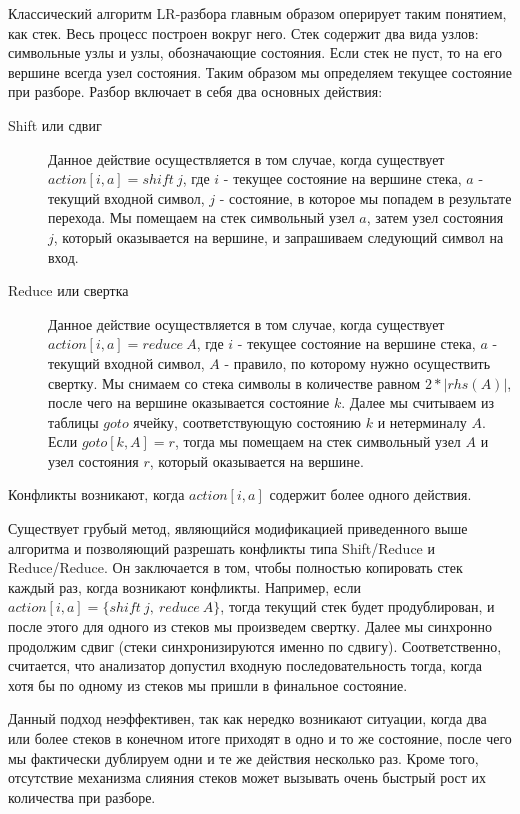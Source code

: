 Классический алгоритм LR-разбора главным образом оперирует таким понятием, как стек. Весь процесс построен вокруг него. Стек содержит два вида узлов: символьные узлы и узлы, обозначающие состояния. Если стек не пуст, то на его вершине всегда узел состояния. Таким образом мы определяем текущее состояние при разборе. Разбор включает в себя два основных действия:
\begin{description}
  \item[Shift или сдвиг] Данное действие осуществляется в том случае, когда существует $action[i, a] = shift\ j$, где $i$ - текущее состояние на вершине стека, $a$ - текущий входной символ, $j$ - состояние, в которое мы попадем в результате перехода. Мы помещаем на стек символьный узел $a$, затем узел состояния $j$, который оказывается на вершине, и запрашиваем следующий символ на вход.
  \item[Reduce или свертка] Данное действие осуществляется в том случае, когда существует $action[i, a] = reduce\ A$, где $i$ - текущее состояние на вершине стека, $a$ - текущий входной символ, $A$ - правило, по которому нужно осуществить свертку. Мы снимаем со стека символы в количестве равном $2 * |rhs(A)|$, после чего на вершине оказывается состояние $k$. Далее мы считываем из таблицы $goto$ ячейку, соответствующую состоянию $k$ и нетерминалу $A$. Если $goto[k, A] = r$, тогда мы помещаем на стек символьный узел $A$ и узел состояния $r$, который оказывается на вершине.
\end{description}
Конфликты возникают, когда $action[i, a]$ содержит более одного действия.

Существует грубый метод, являющийся модификацией приведенного выше алгоритма и позволяющий разрешать конфликты типа Shift/Reduce и Reduce/Reduce. Он заключается в том, чтобы полностью копировать стек каждый раз, когда возникают конфликты. Например, если $action[i, a] = \{shift\ j,\ reduce\ A\}$, тогда текущий стек будет продублирован, и после этого для одного из стеков мы произведем свертку. Далее мы синхронно продолжим сдвиг (стеки синхронизируются именно по сдвигу). Соответственно, считается, что анализатор допустил входную последовательность тогда, когда хотя бы по одному из стеков мы пришли в финальное состояние.

Данный подход неэффективен, так как нередко возникают ситуации, когда два или более стеков в конечном итоге приходят в одно и то же состояние, после чего мы фактически дублируем одни и те же действия несколько раз. Кроме того, отсутствие механизма слияния стеков может вызывать очень быстрый рост их количества при разборе.

